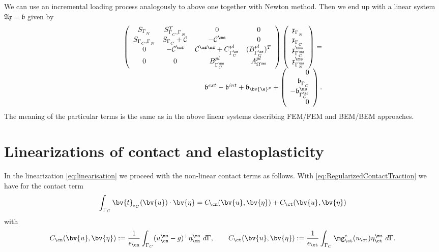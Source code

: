 We can use an incremental loading process analogously to above one together with Newton method. Then we end up with a linear system ${\mathfrak A} {\mathfrak x} = {\mathfrak b}$ given by
\begin{equation*}
 \begin{array}{r}
   \left (
   \begin{array}{cccc}
   S_{\Gamma^{\sl}_N}    & S^{T}_{\Gamma^{\sl}_C,\Gamma^{\sl}_N}                 & 0                & 0\\
   S_{\Gamma^{\sl}_C,\Gamma^{\sl}_N} & S_{\Gamma^{\sl}_C} + \mathcal{C}^{\sl \sl}   & -\mathcal{C}^{\sl \ms}& 0 \\
   0               & -\mathcal{C}^{\ms \sl} & \mathcal{C}^{\ms \ms}+ C^{pl}_{\Gamma^{\ms}_C}  & (B^{pl}_{\Gamma^{\ms}_C})^T \\
   0               & 0                 & B^{pl}_{\Gamma^{\ms}_C} & A^{pl}_{\Omega^{\ms}}
   \end{array}
   \right )
 \left (
  \begin{array}{l}
      \mathfrak x^{\sl}_{\Gamma_N^{\sl}} \\
      \mathfrak x^{\sl}_{\Gamma_C^{\sl}} \\
      \mathfrak x^{\ms}_{\Gamma_C^{\ms}} \\
      \mathfrak x^{\ms}_{\Gamma_N^{\ms}} 
  \end{array}
 \right )
= \\
 {\mathfrak b}^{ext} - {\mathfrak b}^{int} + {\mathfrak b}_{\bv{\e}^p} +
 \left (
  \begin{array}{r}
      0 \\
      {\mathfrak b}^{\sl}_{\Gamma_C^{\sl}} \\
      -{\mathfrak b}^{\ms}_{\Gamma_C^{\ms}} \\
      0 
  \end{array}
 \right ).
 \end{array}
\end{equation*}
The meaning of the particular terms is the same as in the above linear systems describing  FEM/FEM and BEM/BEM approaches.

\newpage
\section{Linearizations of contact and elastoplasticity}\label{sec:ConstitutiveConditions:Discretization}
In the linearization 
\eqref{eq:linearisation}  we proceed with the non-linear contact terms as
follows. With \eqref{eq:RegularizedContactTraction} we have for the contact term
\[
\int_{\Gamma_C} \bv{t}_{\epsilon_C}(\bv{u})\cdot \bv{\eta}  =  C_{\cn}(\bv{u} ,\bv{\eta} ) + C_{\ct}(\bv{u},\bv{\eta} )
\]
with
\begin{align*}
C_{\cn}(\bv{u} ,\bv{\eta} ) := \frac{1}{\epsilon_{\cn}} \int_{\Gamma_C} (u^{\sl\ms}_{\cn} - g)^{+} \eta^{\sl\ms}_{\cn} \,\,d\Gamma,
\qquad
C_{\ct}(\bv{u} ,\bv{\eta} ) := \frac{1}{\epsilon_{\ct}} \int_{\Gamma_C} \mg_{\ct}^e(u_{\ct}) \eta^{\sl\ms}_{\ct} \,\,d\Gamma.
\end{align*}


